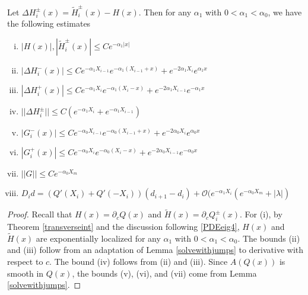 \documentclass[thesis.tex]{subfiles}
\begin{document}
\begin{lemma}\label{stabestimateslemma}
Let $\Delta H_i^\pm(x) = \tilde{H}_i^\pm(x) - H(x)$. Then for any $\alpha_1$ with $0 < \alpha_1 < \alpha_0$, we have the following estimates
\begin{enumerate}[(i)]
\item $|H(x)|, |\tilde{H}_i^\pm(x)| \leq C e^{-\alpha_1 |x|}$
\item $|\Delta H_i^-(x)| \leq C e^{-\alpha_1 X_{i-1}} e^{-\alpha_1(X_{i-1} + x) } + e^{-2 \alpha_1 X_i} e^{\alpha_1 x}$
\item $|\Delta H_i^+(x)| \leq C e^{-\alpha_1 X_i} e^{-\alpha_1(X_i - x) } + e^{-2 \alpha_1 X_{i-1}} e^{-\alpha_1 x}$
\item $||\Delta H_i^\pm|| \leq C(e^{-\alpha_1 X_i} + e^{-\alpha_1 X_{i-1}} )$
\item $|G_i^-(x)| \leq C e^{-\alpha_0 X_{i-1}} e^{-\alpha_0(X_{i-1} + x) } + e^{-2 \alpha_0 X_i} e^{\alpha_0 x}$
\item $|G_i^+(x)| \leq C e^{-\alpha_0 X_i} e^{-\alpha_0(X_i - x) } + e^{-2 \alpha_0 X_{i-1}} e^{-\alpha_0 x}$
\item $||G|| \leq C e^{-\alpha_0 X_m}$
\item $D_i d = ( Q'(X_i) + Q'(-X_i))(d_{i+1} - d_i ) + \mathcal{O} ( e^{-\alpha_1 X_i} (e^{-\alpha_0 X_m} + |\lambda| )$
\end{enumerate}
\begin{proof}
Recall that $H(x) = \partial_c Q(x)$ and $\tilde{H}(x) = \partial_c Q_i^\pm(x)$. For (i), by Theorem \ref{transverseint} and the discussion following \eqref{PDEeig4}, $H(x)$ and $\tilde{H}(x)$ are exponentially localized for any $\alpha_1$ with $0 < \alpha_1 < \alpha_0$. The bounds (ii) and (iii) follow from an adaptation of Lemma \ref{solvewithjumps} to derivative with respect to $c$. The bound (iv) follows from (ii) and (iii). Since $A(Q(x))$ is smooth in $Q(x)$, the bounds (v), (vi), and (vii) come from Lemma \ref{solvewithjumps}.


\end{proof}
\end{lemma}
\end{document}
